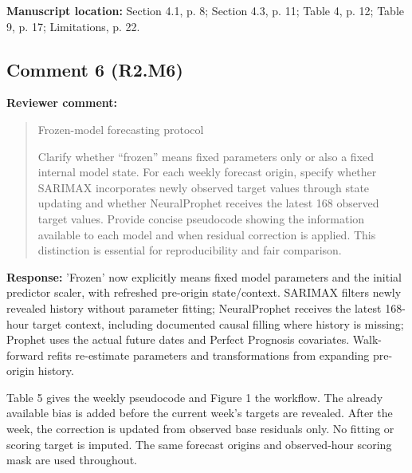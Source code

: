 \documentclass[11pt,a4paper]{article}
\begin{document}
\textbf{Manuscript location:} Section 4.1, p. 8; Section 4.3, p. 11; Table 4, p. 12; Table 9, p. 17; Limitations, p. 22.
\begin{samepage}
\subsection*{Comment 6 (R2.M6)}
\textbf{Reviewer comment:}
\begin{quote}\small Frozen-model forecasting protocol

Clarify whether ``frozen'' means fixed parameters only or also a fixed internal model state. For each weekly forecast origin, specify whether SARIMAX incorporates newly observed target values through state updating and whether NeuralProphet receives the latest 168 observed target values. Provide concise pseudocode showing the information available to each model and when residual correction is applied. This distinction is essential for reproducibility and fair comparison.\end{quote}
\end{samepage}
\textbf{Response:}
'Frozen' now explicitly means fixed model parameters and the initial predictor scaler, with refreshed pre-origin state/context. SARIMAX filters newly revealed history without parameter fitting; NeuralProphet receives the latest 168-hour target context, including documented causal filling where history is missing; Prophet uses the actual future dates and Perfect Prognosis covariates. Walk-forward refits re-estimate parameters and transformations from expanding pre-origin history.

Table 5 gives the weekly pseudocode and Figure 1 the workflow. The already available bias is added before the current week's targets are revealed. After the week, the correction is updated from observed base residuals only. No fitting or scoring target is imputed. The same forecast origins and observed-hour scoring mask are used throughout.
\end{document}
